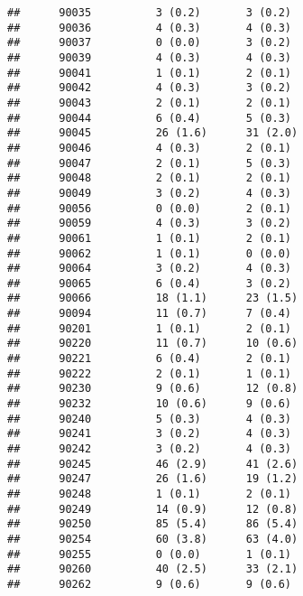 \documentclass[]{article}
\begin{document}
\begin{verbatim}
##      90035          3 (0.2)       3 (0.2)                       
##      90036          4 (0.3)       4 (0.3)                       
##      90037          0 (0.0)       3 (0.2)                       
##      90039          4 (0.3)       4 (0.3)                       
##      90041          1 (0.1)       2 (0.1)                       
##      90042          4 (0.3)       3 (0.2)                       
##      90043          2 (0.1)       2 (0.1)                       
##      90044          6 (0.4)       5 (0.3)                       
##      90045          26 (1.6)      31 (2.0)                      
##      90046          4 (0.3)       2 (0.1)                       
##      90047          2 (0.1)       5 (0.3)                       
##      90048          2 (0.1)       2 (0.1)                       
##      90049          3 (0.2)       4 (0.3)                       
##      90056          0 (0.0)       2 (0.1)                       
##      90059          4 (0.3)       3 (0.2)                       
##      90061          1 (0.1)       2 (0.1)                       
##      90062          1 (0.1)       0 (0.0)                       
##      90064          3 (0.2)       4 (0.3)                       
##      90065          6 (0.4)       3 (0.2)                       
##      90066          18 (1.1)      23 (1.5)                      
##      90094          11 (0.7)      7 (0.4)                       
##      90201          1 (0.1)       2 (0.1)                       
##      90220          11 (0.7)      10 (0.6)                      
##      90221          6 (0.4)       2 (0.1)                       
##      90222          2 (0.1)       1 (0.1)                       
##      90230          9 (0.6)       12 (0.8)                      
##      90232          10 (0.6)      9 (0.6)                       
##      90240          5 (0.3)       4 (0.3)                       
##      90241          3 (0.2)       4 (0.3)                       
##      90242          3 (0.2)       4 (0.3)                       
##      90245          46 (2.9)      41 (2.6)                      
##      90247          26 (1.6)      19 (1.2)                      
##      90248          1 (0.1)       2 (0.1)                       
##      90249          14 (0.9)      12 (0.8)                      
##      90250          85 (5.4)      86 (5.4)                      
##      90254          60 (3.8)      63 (4.0)                      
##      90255          0 (0.0)       1 (0.1)                       
##      90260          40 (2.5)      33 (2.1)                      
##      90262          9 (0.6)       9 (0.6)                       

\end{verbatim}
\end{document}
